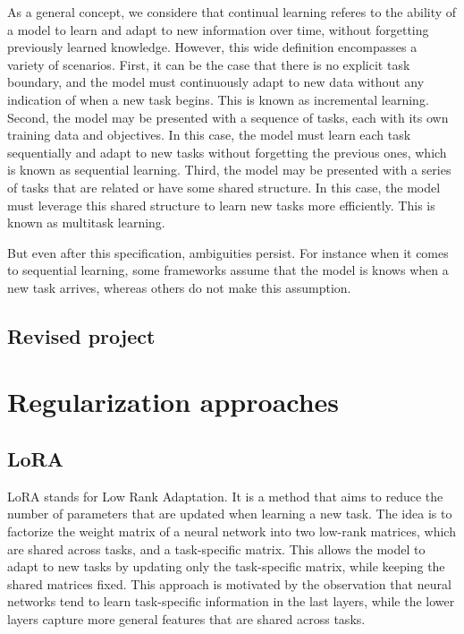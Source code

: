 \documentclass{article}
\begin{document}
As a general concept, we considere that continual learning referes to the ability of a model to learn and adapt to new information over time, without forgetting previously learned knowledge. However, this wide definition encompasses a variety of scenarios.
First, it can be the case that there is no explicit task boundary, and the model must continuously adapt to new data without any indication of when a new task begins. This is known as incremental learning. Second, the model may be presented with a sequence of tasks, each with its own training data and objectives. In this case, the model must learn each task sequentially and adapt to new tasks without forgetting the previous ones, which is known as sequential learning. Third, the model may be presented with a series of tasks that are related or have some shared structure. In this case, the model must leverage this shared structure to learn new tasks more efficiently. This is known as multitask learning.

But even after this specification, ambiguities persist. For instance when it comes to sequential learning, some frameworks assume that the model is knows when a new task arrives, whereas others do not make this assumption.

\subsection{Revised project}


\section{Regularization approaches}

\subsection{LoRA}

LoRA stands for Low Rank Adaptation. It is a method that aims to reduce the number of parameters that are updated when learning a new task. The idea is to factorize the weight matrix of a neural network into two low-rank matrices, which are shared across tasks, and a task-specific matrix. This allows the model to adapt to new tasks by updating only the task-specific matrix, while keeping the shared matrices fixed. This approach is motivated by the observation that neural networks tend to learn task-specific information in the last layers, while the lower layers capture more general features that are shared across tasks.
\end{document}
